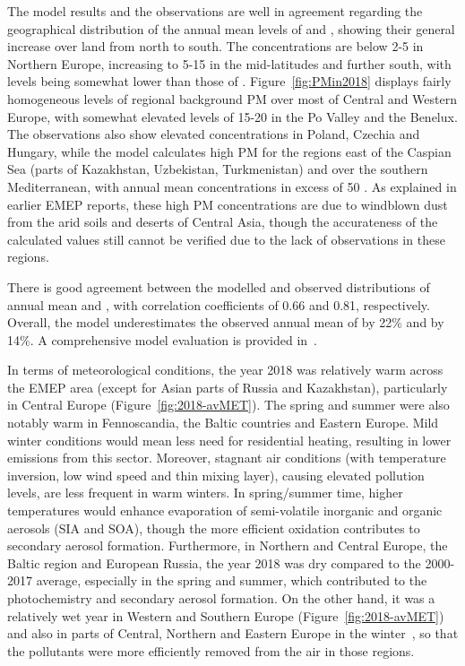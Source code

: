The model results and the observations are well in agreement
regarding the geographical distribution of the annual mean levels of
\PM[10] and \PM[2.5], showing their general increase over land from
north to south. The concentrations are below 2-5 \ug in Northern
Europe, increasing to 5-15 \ug in the mid-latitudes and further south,
with \PM[2.5] levels being somewhat lower than those of
\PM[10]. Figure~\ref{fig:PMin2018} displays fairly homogeneous levels
of regional background PM over most of Central and Western Europe,
with somewhat elevated \PM[10] levels of 15-20 \ug in the Po Valley and
the Benelux. The observations also show elevated \PM[10] concentrations in Poland, Czechia and Hungary, while
the model calculates high PM for the regions east of the Caspian Sea
(parts of Kazakhstan, Uzbekistan, Turkmenistan) and over the southern
Mediterranean, with annual mean concentrations in excess of 50
\ug. As explained in earlier EMEP reports, these high PM
concentrations are due to windblown dust from the arid soils and
deserts of Central Asia, though the accurateness of the calculated
values still cannot be verified due to the lack of
observations in these regions.

There is good agreement between the modelled and observed
distributions of annual mean \PM[10] and \PM[2.5], with correlation
coefficients of 0.66 and 0.81, respectively. Overall, the model
underestimates the observed annual mean of \PM[10] by 22\% and
\PM[2.5] by 14\%. A comprehensive model evaluation is provided in~\cite{WEB2020:PM}.

In terms of meteorological conditions, the year 2018 was relatively warm across the EMEP area (except for Asian parts of Russia and Kazakhstan), particularly in Central Europe  (Figure~\ref{fig:2018-avMET}). The spring and summer were also notably warm in Fennoscandia, the Baltic countries and Eastern Europe. Mild winter conditions would mean less need for residential heating, resulting in lower emissions from this sector. Moreover, stagnant air conditions (with temperature inversion, low wind speed and thin mixing layer), causing elevated pollution levels, are less frequent in warm winters. In spring/summer time, higher temperatures would enhance evaporation of semi-volatile inorganic and organic aerosols (SIA and SOA), though the more efficient oxidation contributes to secondary aerosol formation. Furthermore, in Northern and Central Europe, the Baltic region and European Russia, the year 2018 was dry compared to the 2000-2017 average, especially in the spring and summer, which contributed to the photochemistry and secondary aerosol formation. On the other hand, it was a relatively wet year in Western and Southern Europe (Figure~\ref{fig:2018-avMET}) and also in parts of Central, Northern and Eastern Europe in the winter~\citep{CAMS2019}, so that the pollutants were more efficiently removed from the air in those regions.  

